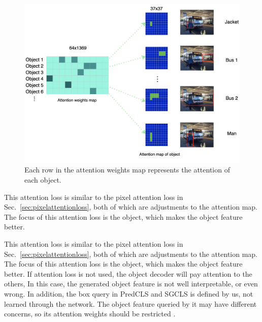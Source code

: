  \begin{figure}[htp!]
	\centering
	\includegraphics[width=0.9\linewidth]{figures/attention_map}
	\caption[Illustration of the attention map]{Each row in the attention weights map represents the attention of each object. }
	\label{fig:attentionmap}
\end{figure} 

This attention loss is similar to the pixel attention loss in Sec.~\ref{sec:pixelattentionloss}, both of which are adjustments to the attention map. The focus of this attention loss is the object, which makes the object feature better.

This attention loss is similar to the pixel attention loss in Sec.~\ref{sec:pixelattentionloss}, both of which are adjustments to the attention map. The focus of this attention loss is the object, which makes the object feature better. If attention loss is not used, the object decoder will pay attention to the others, In this case, the generated object feature is not well interpretable, or even wrong. In addition, the box query in PredCLS and SGCLS is defined by us, not learned through the network. The object feature queried by it may have different concerns, so its  attention weights should be restricted .%

